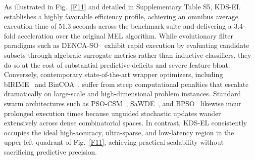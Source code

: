 As illustrated in Fig.~\ref{F11} and detailed in Supplementary Table S5, KDS-EL establishes a highly favorable efficiency profile, achieving an omnibus average execution time of 51.3 seconds across the benchmark suite and delivering a 3.4-fold acceleration over the original MEL algorithm. While evolutionary filter paradigms such as DENCA-SO~\cite{hancer2023} exhibit rapid execution by evaluating candidate subsets through algebraic surrogate metrics rather than inductive classifiers, they do so at the cost of substantial predictive deficits and severe feature bloat. Conversely, contemporary state-of-the-art wrapper optimizers, including bIRIME~\cite{su2024} and BinCOA~\cite{shikoun2024}, suffer from steep computational penalties that escalate dramatically on large-scale and high-dimensional problem instances. Standard swarm architectures such as PSO-CSM~\cite{wei2025}, SaWDE~\cite{wang2022}, and BPSO~\cite{kennedy1997} likewise incur prolonged execution times because unguided stochastic updates wander extensively across dense combinatorial spaces. In contrast, KDS-EL consistently occupies the ideal high-accuracy, ultra-sparse, and low-latency region in the upper-left quadrant of Fig.~\ref{F11}, achieving practical scalability without sacrificing predictive precision.

